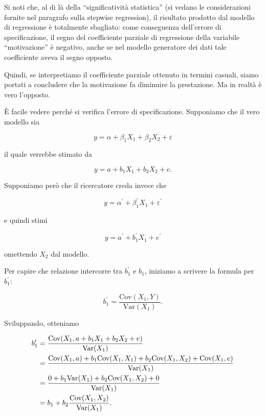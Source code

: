 \documentclass[
  11pt,
]{krantz}
\theoremstyle{definition}
\theoremstyle{definition}
\theoremstyle{definition}
\theoremstyle{definition}
\theoremstyle{remark}
\begin{document}
Si noti che, al di là della ``significatività statistica'' (si vedano le considerazioni fornite nel paragrafo sulla stepwise regression), il risultato prodotto dal modello di regressione è totalmente sbagliato: come conseguenza dell'errore di specificazione, il segno del coefficiente parziale di regressione della variabile ``motivazione'' è negativo, anche se nel modello generatore dei dati tale coefficiente aveva il segno opposto.

Quindi, se interpretiamo il coefficiente parziale ottenuto in termini casuali, siamo portati a concludere che la motivazione fa diminuire la prestazione. Ma in realtà è vero l'opposto.

È facile vedere perché si verifica l'errore di specificazione. Supponiamo che il vero modello sia

\[
y = \alpha + \beta_1 X_1 + \beta_2 X_2 + \varepsilon
\]

il quale verrebbe stimato da

\[
y = a + b_1 X_1 + b_2 X_2 + e.
\]

Supponiamo però che il ricercatore creda invece che

\[
y = \alpha^\prime + \beta_1^\prime X_1 + \varepsilon^\prime
\]

e quindi stimi

\[
y = a^\prime + b_1^\prime X_1 + e^\prime
\]

omettendo \(X_2\) dal modello.

Per capire che relazione intercorre tra \(b_1^\prime\) e \(b_1\), iniziamo a scrivere la formula per \(b_1^\prime\):

\begin{equation}
b_1^\prime = \frac{\mbox{Cov}(X_1, Y)}{\mbox{Var}(X_1)}.
\end{equation}

Sviluppando, otteniamo

\begin{equation}
\begin{aligned}
b_1^\prime &= \frac{\mbox{Cov}(X_1, a + b_1 X_1 + b_2 X_2 + e)}{\mbox{Var}(X_1)}\notag\\
&= \frac{\mbox{Cov}(X_1, a)+b_1 \mbox{Cov}(X_1, X_1) + b_2 \mbox{Cov}(X_1, X_2) + \mbox{Cov}(X_1, e)}{\mbox{Var}(X_1)}\notag\\
&= \frac{0 + b_1 \mbox{Var}(X_1) + b_2 \mbox{Cov}(X_1, X_2) + 0}{\mbox{Var}(X_1)}\notag\\
&= b_1 + b_2 \frac{\mbox{Cov}(X_1, X_2)}{\mbox{Var}(X_1)}.
\end{aligned}
\end{equation}
\end{document}

